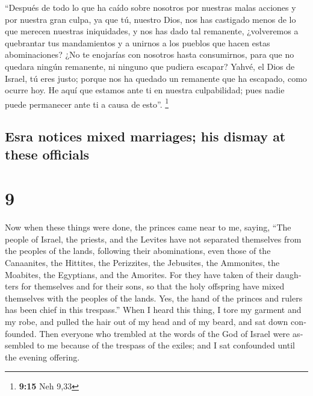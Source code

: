 \begin{paracol}{2}
 ``Después de todo lo que ha caído sobre nosotros por
nuestras malas acciones y por nuestra gran culpa, ya que tú, nuestro
Dios, nos has castigado menos de lo que merecen nuestras iniquidades, y
nos has dado tal remanente,  ¿volveremos a quebrantar tus
mandamientos y a unirnos a los pueblos que hacen estas abominaciones?
¿No te enojarías con nosotros hasta consumirnos, para que no quedara
ningún remanente, ni ninguno que pudiera escapar?  Yahvé,
el Dios de Israel, tú eres justo; porque nos ha quedado un remanente que
ha escapado, como ocurre hoy. He aquí que estamos ante ti en nuestra
culpabilidad; pues nadie puede permanecer ante ti a causa de esto''.
\footnote{\textbf{9:15} Neh 9,33}

\switchcolumn
\begin{otherlanguage}{english}

\hypertarget{esra-notices-mixed-marriages-his-dismay-at-these-officials}{%
\subsection{Esra notices mixed marriages; his dismay at these
officials}\label{esra-notices-mixed-marriages-his-dismay-at-these-officials}}

\hypertarget{section-17}{%
\section{9}\label{section-17}}

 Now when these things were done, the princes came near to
me, saying, ``The people of Israel, the priests, and the Levites have
not separated themselves from the peoples of the lands, following their
abominations, even those of the Canaanites, the Hittites, the
Perizzites, the Jebusites, the Ammonites, the Moabites, the Egyptians,
and the Amorites.  For they have taken of their daughters
for themselves and for their sons, so that the holy offspring have mixed
themselves with the peoples of the lands. Yes, the hand of the princes
and rulers has been chief in this trespass.''  When I
heard this thing, I tore my garment and my robe, and pulled the hair out
of my head and of my beard, and sat down confounded.  Then
everyone who trembled at the words of the God of Israel were assembled
to me because of the trespass of the exiles; and I sat confounded until
the evening offering.

\hypertarget{ezras-penitential-prayer}{%
}
\end{otherlanguage}
\end{paracol}
